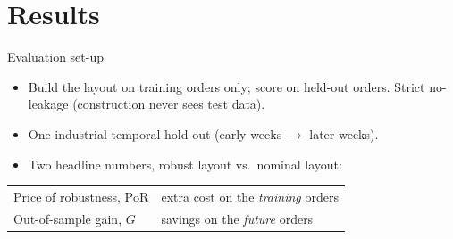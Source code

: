 \documentclass[11pt,aspectratio=169]{beamer}
\begin{document}
\section{Results}
\begin{frame}{Evaluation set-up}
  \begin{itemize}
    \item Build the layout on \alert{training} orders only; score on \alert{held-out}
          orders. Strict no-leakage (construction never sees test data).
    \item One \alert{industrial} temporal hold-out (early weeks $\to$ later weeks).
    \item Two headline numbers, robust layout vs.\ nominal layout:
  \end{itemize}
  \vspace{0.4em}
  \begin{center}
  \begin{tabular}{@{}ll@{}}
    \toprule
    Price of robustness, $\mathrm{PoR}$ & extra cost on the \emph{training} orders \\
    Out-of-sample gain, $G$ & savings on the \emph{future} orders  \\
    \bottomrule
  \end{tabular}
  \end{center}
\end{frame}
\end{document}
